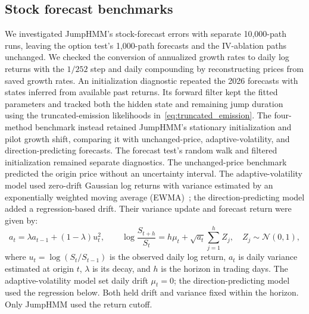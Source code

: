\subsection{Stock forecast benchmarks}\label{sec:stock_validation_methods}

We investigated JumpHMM's stock-forecast errors with separate 10{,}000-path runs, leaving the option test's 1{,}000-path forecasts and the IV-ablation paths unchanged. We checked the conversion of annualized growth rates to daily log returns with the $1/252$ step and daily compounding by reconstructing prices from saved growth rates. An initialization diagnostic repeated the 2026 forecasts with states inferred from available past returns. Its forward filter kept the fitted parameters and tracked both the hidden state and remaining jump duration using the truncated-emission likelihoods in~\eqref{eq:truncated_emission}. The four-method benchmark instead retained JumpHMM's stationary initialization and pilot growth shift, comparing it with unchanged-price, adaptive-volatility, and direction-predicting forecasts. The forecast test's random walk and filtered initialization remained separate diagnostics. The unchanged-price benchmark predicted the origin price without an uncertainty interval. The adaptive-volatility model used zero-drift Gaussian log returns with variance estimated by an exponentially weighted moving average (EWMA)~\cite{riskmetrics1996}; the direction-predicting model added a regression-based drift. Their variance update and forecast return were given by:
\begin{equation}\label{eq:stock_benchmark}
a_t=\lambda a_{t-1}+(1-\lambda)u_t^2,
\qquad
\log\frac{S_{t+h}}{S_t}=h\mu_t+\sqrt{a_t}\sum_{j=1}^{h}Z_j,
\quad Z_j\sim\mathcal N(0,1),
\end{equation}
where $u_t=\log(S_t/S_{t-1})$ is the observed daily log return, $a_t$ is daily variance estimated at origin $t$, $\lambda$ is its decay, and $h$ is the horizon in trading days. The adaptive-volatility model set daily drift $\mu_t=0$; the direction-predicting model used the regression below. Both held drift and variance fixed within the horizon. Only JumpHMM used the return cutoff.

